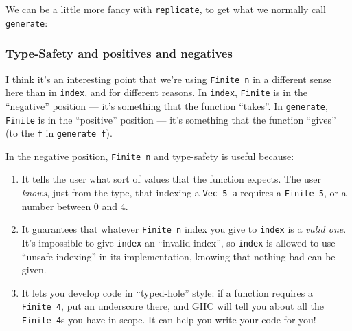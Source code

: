 \documentclass[]{article}
\newenvironment{Shaded}{}{}
\newcommand{\KeywordTok}[1]{\textcolor[rgb]{0.00,0.44,0.13}{\textbf{#1}}}
\newcommand{\DataTypeTok}[1]{\textcolor[rgb]{0.56,0.13,0.00}{#1}}
\newcommand{\CommentTok}[1]{\textcolor[rgb]{0.38,0.63,0.69}{\textit{#1}}}
\newcommand{\OtherTok}[1]{\textcolor[rgb]{0.00,0.44,0.13}{#1}}
\newcommand{\FunctionTok}[1]{\textcolor[rgb]{0.02,0.16,0.49}{#1}}
\newcommand{\NormalTok}[1]{#1}
\begin{document}
We can be a little more fancy with \texttt{replicate}, to get what we normally
call \texttt{generate}:

\begin{Shaded}
\end{Shaded}

\subsubsection{Type-Safety and positives and
negatives}\label{type-safety-and-positives-and-negatives}

I think it's an interesting point that we're using \texttt{Finite\ n} in a
different sense here than in \texttt{index}, and for different reasons. In
\texttt{index}, \texttt{Finite} is in the ``negative'' position --- it's
something that the function ``takes''. In \texttt{generate}, \texttt{Finite} is
in the ``positive'' position --- it's something that the function ``gives'' (to
the \texttt{f} in \texttt{generate\ f}).

In the negative position, \texttt{Finite\ n} and type-safety is useful because:

\begin{enumerate}
\def\labelenumi{\arabic{enumi}.}
\tightlist
\item
  It tells the user what sort of values that the function expects. The user
  \emph{knows}, just from the type, that indexing a \texttt{Vec\ 5\ a} requires
  a \texttt{Finite\ 5}, or a number between 0 and 4.
\item
  It guarantees that whatever \texttt{Finite\ n} index you give to
  \texttt{index} is a \emph{valid one}. It's impossible to give \texttt{index}
  an ``invalid index'', so \texttt{index} is allowed to use ``unsafe indexing''
  in its implementation, knowing that nothing bad can be given.
\item
  It lets you develop code in ``typed-hole'' style: if a function requires a
  \texttt{Finite\ 4}, put an underscore there, and GHC will tell you about all
  the \texttt{Finite\ 4}s you have in scope. It can help you write your code for
  you!
\end{enumerate}
\end{document}
